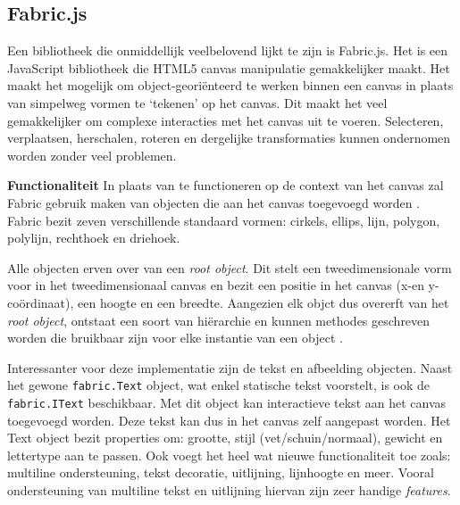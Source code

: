 \subsection{Fabric.js}
Een bibliotheek die onmiddellijk veelbelovend lijkt te zijn is Fabric.js. Het is een JavaScript bibliotheek die HTML5 canvas manipulatie gemakkelijker maakt. Het maakt het mogelijk om object-geori\"{e}nteerd te werken binnen een canvas in plaats van simpelweg vormen te `tekenen' op het canvas. Dit maakt het veel gemakkelijker om complexe interacties met het canvas uit te voeren. Selecteren, verplaatsen, herschalen, roteren en dergelijke transformaties kunnen ondernomen worden zonder veel problemen. 

\textbf{Functionaliteit} \break 
In plaats van te functioneren op de context van het canvas zal Fabric gebruik maken van objecten die aan het canvas toegevoegd worden \cite{FabricJSDocs}. Fabric bezit zeven verschillende standaard vormen: cirkels, ellips, lijn, polygon, polylijn, rechthoek en driehoek.

Alle objecten erven over van een \textit{root object}. Dit stelt een tweedimensionale vorm voor in het tweedimensionaal canvas en bezit een positie in het canvas (x-en y-co\"{o}rdinaat), een hoogte en een breedte. Aangezien elk objct dus overerft van het \textit{root object}, ontstaat een soort van hi\"{e}rarchie en kunnen methodes geschreven worden die bruikbaar zijn voor elke instantie van een object \cite{FabricJSIntro}. 

Interessanter voor deze implementatie zijn de tekst en afbeelding objecten. Naast het gewone \texttt{fabric.Text} object, wat enkel statische tekst voorstelt, is ook de \texttt{fabric.IText} beschikbaar. Met dit object kan interactieve tekst aan het canvas toegevoegd worden. Deze tekst kan dus in het canvas zelf aangepast worden. Het Text object bezit properties om: grootte, stijl (vet/schuin/normaal), gewicht en lettertype aan te passen. Ook voegt het heel wat nieuwe functionaliteit toe zoals: multiline ondersteuning, tekst decoratie, uitlijning, lijnhoogte en meer. 
Vooral ondersteuning van multiline tekst en uitlijning hiervan zijn zeer handige \textit{features}.  %

